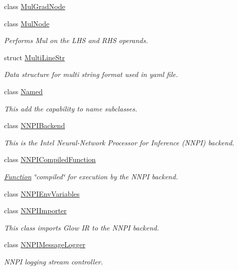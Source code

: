 \begin{DoxyCompactItemize}
class \hyperlink{classglow_1_1_mul_grad_node}{Mul\+Grad\+Node}
\item 
class \hyperlink{classglow_1_1_mul_node}{Mul\+Node}
\begin{DoxyCompactList}\small\item\em Performs Mul on the L\+HS and R\+HS operands. \end{DoxyCompactList}\item 
struct \hyperlink{structglow_1_1_multi_line_str}{Multi\+Line\+Str}
\begin{DoxyCompactList}\small\item\em Data structure for multi string format used in yaml file. \end{DoxyCompactList}\item 
class \hyperlink{classglow_1_1_named}{Named}
\begin{DoxyCompactList}\small\item\em This add the capability to name subclasses. \end{DoxyCompactList}\item 
class \hyperlink{classglow_1_1_n_n_p_i_backend}{N\+N\+P\+I\+Backend}
\begin{DoxyCompactList}\small\item\em This is the Intel Neural-\/\+Network Processor for Inference (N\+N\+PI) backend. \end{DoxyCompactList}\item 
class \hyperlink{classglow_1_1_n_n_p_i_compiled_function}{N\+N\+P\+I\+Compiled\+Function}
\begin{DoxyCompactList}\small\item\em \hyperlink{classglow_1_1_function}{Function} \char`\"{}compiled\char`\"{} for execution by the N\+N\+PI backend. \end{DoxyCompactList}\item 
class \hyperlink{classglow_1_1_n_n_p_i_env_variables}{N\+N\+P\+I\+Env\+Variables}
\item 
class \hyperlink{classglow_1_1_n_n_p_i_importer}{N\+N\+P\+I\+Importer}
\begin{DoxyCompactList}\small\item\em This class imports Glow IR to the N\+N\+PI backend. \end{DoxyCompactList}\item 
class \hyperlink{classglow_1_1_n_n_p_i_message_logger}{N\+N\+P\+I\+Message\+Logger}
\begin{DoxyCompactList}\small\item\em N\+N\+PI logging stream controller. \end{DoxyCompactList}\item 

\end{DoxyCompactItemize}
